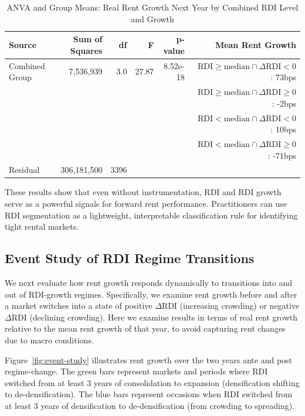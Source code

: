 \documentclass[APA,Times1COL]{WileyNJDv5} %
\begin{document}
\begin{table}[h]
	\centering
	\caption{ANVA and Group Means: Real Rent Growth Next Year by Combined RDI Level and Growth}
	\label{tab:combined-anova}
\begin{tabular}{lrrrrr}
	\toprule
	Source              & Sum of Squares & df    & F        & p-value     & Mean Rent Growth \\
	\midrule
	Combined Group      & 7,536,939      & 3.0   & 27.87    & 8.52e-18    & \(\text{RDI}\geq \text{median} \cap\Delta\text{RDI}< 0\) : 73bps \\
	&                &       &          &             & \(\text{RDI}\geq \text{median} \cap\Delta\text{RDI}\geq 0\) : -2bps \\
	&                &       &          &             &  \(\text{RDI} < \text{median} \cap\Delta\text{RDI}< 0\) : 10bps \\
	&                &       &          &             & \(\text{RDI}< \text{median} \cap\Delta\text{RDI}\geq 0\) : -71bps \\
	Residual            & 306,181,500    & 3396  &          &             & \\
	\bottomrule
\end{tabular}
\end{table}

These results show that even without instrumentation, RDI and RDI growth serve as a powerful signals for forward rent performance. Practitioners can use RDI segmentation as a lightweight, interpretable classification rule for identifying tight rental markets.

\subsection{Event Study of RDI Regime Transitions}
We next evaluate how rent growth responds dynamically to transitions into and out of RDI-growth regimes. Specifically, we examine rent growth before and after a market switches into a state of positive  $\Delta$RDI (increasing crowding) or  negative  $\Delta$RDI (declining crowding). Here we examine results in terms of real rent growth relative to the mean rent growth of that year, to avoid capturing rent changes due to macro conditions.

Figure~\ref{fig:event-study} illustrates rent growth over the two years ante and post regime-change. The green bars represent markets and periods where RDI switched from at least 3 years of consolidation to expansion (densification shifting to de-densification). The blue bars represent occasions when RDI switched from at least 3 years of densification to de-densification (from crowding to spreading). 
\end{document}
